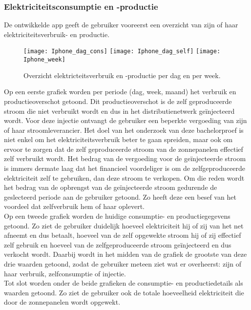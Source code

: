 \subsubsection{Elektriciteitsconsumptie en -productie}
De ontwikkelde app geeft de gebruiker vooreerst een overzicht van zijn of haar elektriciteitsverbruik- en productie. 

\begin{figure}[h!]
    \centering
    \texttt{[image: Iphone\_dag\_cons]} \hspace{0.1cm}
    \texttt{[image: Iphone\_dag\_self]} \hspace{0.1cm}
    \texttt{[image: Iphone\_week]}
    \caption{Overzicht elektricteitsverbruik en -productie per dag en per week.}
\end{figure}

Op een eerste grafiek worden per periode (dag, week, maand) het verbruik en productieoverschot getoond. Dit productieoverschot is de zelf geproduceerde stroom die niet verbruikt wordt en dus in het distributienetwerk geïnjecteerd wordt. Voor deze injectie ontvangt de gebruiker een beperkte vergoeding van zijn of haar stroomleverancier. Het doel van het onderzoek van deze bachelorproef is niet enkel om het elektriciteitsverbruik beter te gaan spreiden, maar ook om ervoor te zorgen dat de zelf geproduceerde stroom van de zonnepanelen effectief zelf verbruikt wordt. Het bedrag van de vergoeding voor de geïnjecteerde stroom is immers dermate laag dat het financieel voordeliger is om de zelfgeproduceerde elektriciteit zelf te gebruiken, dan deze stroom te verkopen. Om die reden wordt het bedrag van de opbrengst van de geïnjecteerde stroom gedurende de geslecteerd periode aan de gebruiker getoond. Zo heeft deze een besef van het voordeel dat zelfverbruik hem of haar oplevert. \\

Op een tweede grafiek worden de huidige consumptie- en productiegegevens getoond. Zo ziet de gebruiker duidelijk hoeveel elektriciteit hij of zij van het net afneemt en dus betaalt, hoeveel van de zelf opgewekte stroom hij of zij effectief zelf gebruik en hoeveel van de zelfgeproduceerde stroom geïnjecteerd en dus verkocht wordt. Daarbij wordt in het midden van de grafiek de grootste van deze drie waarden getoond, zodat de gebruiker meteen ziet wat er overheerst: zijn of haar verbruik, zelfconsumptie of injectie. \\

Tot slot worden onder de beide grafieken de consumptie- en productiedetails als waarden getoond. Zo ziet de gebruiker ook de totale hoeveelheid elektriciteit die door de zonnepanelen wordt opgewekt.

